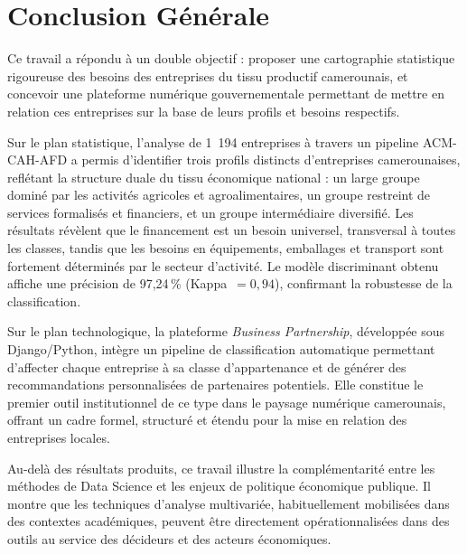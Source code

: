 \documentclass[12pt, a4paper, oneside]{report}
\begin{document}
\chapter*{Conclusion Générale}

Ce travail a répondu à un double objectif : proposer une cartographie statistique rigoureuse des besoins des entreprises du tissu productif camerounais, et concevoir une plateforme numérique gouvernementale permettant de mettre en relation ces entreprises sur la base de leurs profils et besoins respectifs.

Sur le plan statistique, l'analyse de 1~194 entreprises à travers un pipeline ACM-CAH-AFD a permis d'identifier trois profils distincts d'entreprises camerounaises, reflétant la structure duale du tissu économique national : un large groupe dominé par les activités agricoles et agroalimentaires, un groupe restreint de services formalisés et financiers, et un groupe intermédiaire diversifié. Les résultats révèlent que le financement est un besoin universel, transversal à toutes les classes, tandis que les besoins en équipements, emballages et transport sont fortement déterminés par le secteur d'activité. Le modèle discriminant obtenu affiche une précision de 97,24\,\% (Kappa~$= 0{,}94$), confirmant la robustesse de la classification.

Sur le plan technologique, la plateforme \textit{Business Partnership}, développée sous Django/Python, intègre un pipeline de classification automatique permettant d'affecter chaque entreprise à sa classe d'appartenance et de générer des recommandations personnalisées de partenaires potentiels. Elle constitue le premier outil institutionnel de ce type dans le paysage numérique camerounais, offrant un cadre formel, structuré et étendu pour la mise en relation des entreprises locales.

Au-delà des résultats produits, ce travail illustre la complémentarité entre les méthodes de Data Science et les enjeux de politique économique publique. Il montre que les techniques d'analyse multivariée, habituellement mobilisées dans des contextes académiques, peuvent être directement opérationnalisées dans des outils au service des décideurs et des acteurs économiques.

\medskip
\end{document}
